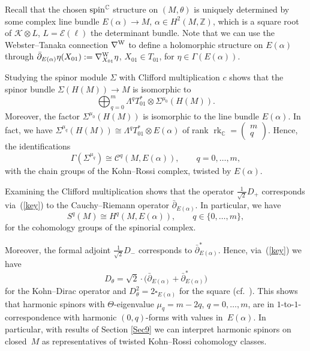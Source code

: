 \documentclass[10pt,a4paper]{amsart}
\numberwithin{equation}{section}
\newcommand{\ZZ}{\mathbb{Z}}
\newcommand{\CC}{\mathbb{C}}
\begin{document}
Recall that the chosen ${\rm spin}^\CC$ structure on $(M,\theta)$ is
uniquely determined by some complex line bundle $E(\alpha)\to M$, $\alpha\in H^2(M,\ZZ)$, which is a square root of $\mathcal{K}\otimes L$,
$L=\mathcal{E}(\ell)$ the determinant bundle. Note that we can use the Webster--Tanaka connection $\nabla^{\rm W}$ to define a holomorphic
structure on $E(\alpha)$ through $\bar{\partial}_{E(\alpha)}\eta(X_{01}):=\nabla^{\rm W}_{X_{01}}\eta$, $X_{01}\in T_{01}$, for $\eta\in\Gamma(E(\alpha))$.

Studying the spinor module $\Sigma$ with Clifford multiplication $c$ shows that the spinor bundle $\Sigma(H(M))\to M$ is isomorphic to
\[
\bigoplus_{q=0}^m \Lambda^{q}T_{01}^* \otimes \Sigma^{\mu_0}(H(M)).
\]
Moreover, the factor $\Sigma^{\mu_0}(H(M))$ is isomorphic to the line bundle $E(\alpha)$. In fact, we have
$\Sigma^{\mu_q}(H(M))\cong \Lambda^{q}T_{01}^*\otimes E(\alpha)$ of rank
$\operatorname{rk}_\CC=\left( \begin{smallmatrix} m\\ q\end{smallmatrix}\right)$.
Hence, the identifications{\samepage
\begin{equation}\label{key}
\Gamma(\Sigma^{\mu_q}) \cong \mathcal{C}^q(M,E(\alpha)),\qquad q=0,\dots,m,
\end{equation}
with the chain groups of the Kohn--Rossi complex, twisted by $E(\alpha)$.}

Examining the Clifford multiplication shows that
the operator $\frac{1}{\sqrt{2}}D_+$ corresponds via~(\ref{key}) to the Cauchy--Riemann operator $\bar{\partial}_{E(\alpha)}$.
In particular, we have
\[
S^q(M) \cong H^q(M,E(\alpha)),\qquad q\in\{0,\dots,m\},
\]
for the cohomology groups of the spinorial complex.

Moreover, the formal adjoint $\frac{1}{\sqrt{2}}D_-$ corresponds to $\bar{\partial}^*_{E(\alpha)}$. Hence, via~(\ref{key})
we have
\[
D_\theta = \sqrt{2}\cdot \big(\bar{\partial}_{E(\alpha)} + \bar{\partial}^*_{E(\alpha)}\big)
\]
for  the Kohn--Dirac operator and $D^2_\theta =2\square_{E(\alpha)}$ for the square (cf.~\cite{Pet}). This shows that harmonic spinors with
$\Theta$-eigenvalue $\mu_q=m-2q$, $q=0,\dots,m$, are in $1$-to-$1$-correspondence with harmonic $(0,q)$-forms with values in~$E(\alpha)$.
In particular, with results of Section \ref{Sec9} we can interpret harmonic spinors on closed~$M$ as representatives of
twisted Kohn--Rossi cohomology classes.
\end{document}

